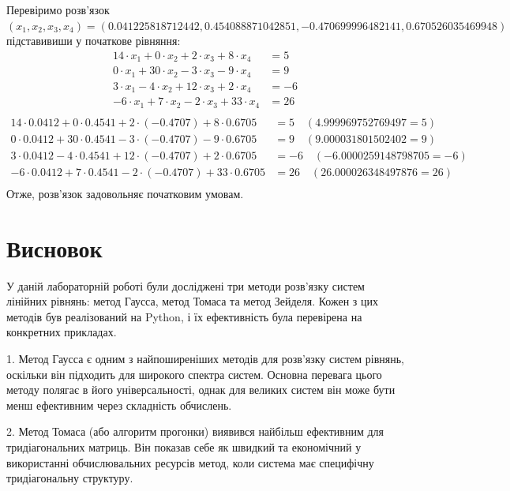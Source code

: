 \documentclass[a4paper, 12pt]{article}
\begin{document}
Перевіримо розв'язок \((x_1, x_2, x_3, x_4) = (0.041225818712442, 0.454088871042851, -0.470699996482141, 0.670526035469948)\) підставивиши у початкове рівняння: 
\[ 
\begin{aligned}
14 \cdot x_1 + 0 \cdot x_2 + 2 \cdot x_3 + 8 \cdot x_4 &= 5 \\
 0 \cdot x_1 + 30 \cdot x_2 - 3 \cdot x_3 - 9 \cdot x_4 &= 9 \\
 3 \cdot x_1 - 4 \cdot x_2 + 12 \cdot x_3 + 2 \cdot x_4 &= -6 \\
 -6 \cdot x_1 + 7 \cdot x_2 - 2 \cdot x_3 + 33 \cdot x_4 &= 26 \\
 \end{aligned} \] 
 \[ 
 \begin{aligned}
 14 \cdot 0.0412 + 0 \cdot 0.4541 + 2 \cdot (-0.4707) + 8 \cdot 0.6705 &= 5 \quad (4.999969752769497 = 5) \\
 0 \cdot 0.0412 + 30 \cdot 0.4541 - 3 \cdot (-0.4707) - 9 \cdot 0.6705 &= 9 \quad (9.000031801502402 = 9) \\
 3 \cdot 0.0412 - 4 \cdot 0.4541 + 12 \cdot (-0.4707) + 2 \cdot 0.6705 &= -6 \quad (-6.0000259148798705 = -6) \\
 -6 \cdot 0.0412 + 7 \cdot 0.4541 - 2 \cdot (-0.4707) + 33 \cdot 0.6705 &= 26 \quad (26.000026348497876 = 26) \\
 \end{aligned}
\]
Отже, розв'язок задовольняє початковим умовам.

\newpage
\section{Висновок}

У даній лабораторній роботі були досліджені три методи розв'язку систем
лінійних рівнянь: метод Гаусса, метод Томаса та метод Зейделя. Кожен з цих
методів був реалізований на Python, і їх ефективність була перевірена на
конкретних прикладах.

1. Метод Гаусса є одним з найпоширеніших методів для розв'язку систем
рівнянь, оскільки він підходить для широкого спектра систем. Основна перевага
цього методу полягає в його універсальності, однак для великих систем він може
бути менш ефективним через складність обчислень.

2. Метод Томаса (або алгоритм прогонки) виявився найбільш ефективним для
тридіагональних матриць. Він показав себе як швидкий та економічний у
використанні обчислювальних ресурсів метод, коли система має специфічну
тридіагональну структуру.
\end{document}

